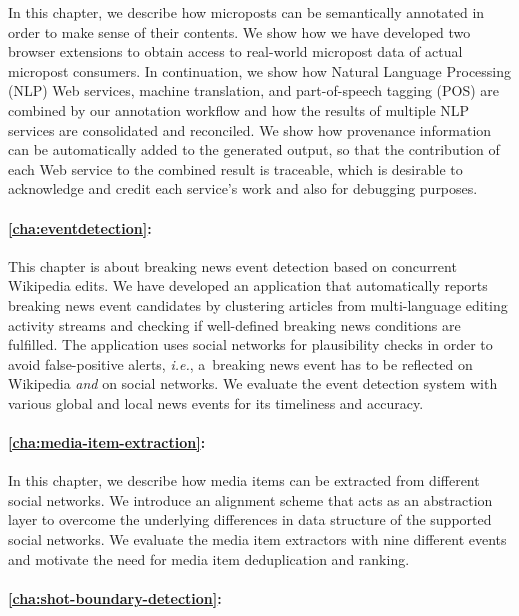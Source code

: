 In this chapter, we describe how microposts can be semantically annotated
in order to make sense of their contents.
We show how we have developed two browser extensions to obtain access
to real-world micropost data of actual micropost consumers.
In continuation, we show how Natural Language Processing (NLP)
Web services, machine translation, and part-of-speech tagging (POS)
are combined by our annotation workflow
and how the results of multiple NLP services are consolidated and reconciled.
We show how provenance information can be automatically added
to the generated output, so that the contribution
of each Web service to the combined result is traceable,
which is desirable to acknowledge and credit each service's work 
and also for debugging purposes.

\paragraph{\autoref{cha:eventdetection}:}

This chapter is about breaking news event detection 
based on concurrent Wikipedia edits.
We have developed an application that automatically
reports breaking news event candidates by clustering 
articles from multi-language editing activity streams
and checking if well-defined breaking news conditions are fulfilled.
The application uses social networks for plausibility checks
in order to avoid false-positive alerts,
\emph{i.e.}, a~breaking news event has to be reflected on Wikipedia
\emph{and} on social networks.
We evaluate the event detection system with various
global and local news events for its timeliness and accuracy.

\paragraph{\autoref{cha:media-item-extraction}:}

In this chapter, we describe how media items can be extracted
from different social networks.
We introduce an alignment scheme that acts as an abstraction layer
to overcome the underlying differences in data structure of 
the supported social networks.
We evaluate the media item extractors with nine different events
and motivate the need for media item deduplication and ranking.

\paragraph{\autoref{cha:shot-boundary-detection}:}

